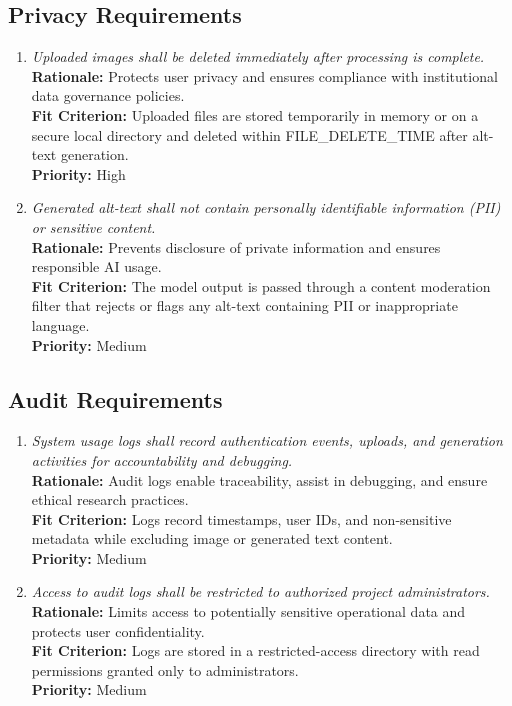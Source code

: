 \documentclass[12pt]{article}
\begin{document}
\subsection{Privacy Requirements}
\begin{enumerate}[label=SR-PR \arabic*., wide=0pt, leftmargin=*]
\item \emph{Uploaded images shall be deleted immediately after processing is complete.}\\[2mm] 
    {\bf Rationale:} Protects user privacy and ensures compliance with institutional data governance policies.\\
    {\bf Fit Criterion:} Uploaded files are stored temporarily in memory or on a secure local directory and deleted within FILE\_DELETE\_TIME after alt-text generation.\\
    {\bf Priority:} High

\item \emph{Generated alt-text shall not contain personally identifiable information (PII) or sensitive content.}\\[2mm] 
    {\bf Rationale:} Prevents disclosure of private information and ensures responsible AI usage.\\
    {\bf Fit Criterion:} The model output is passed through a content moderation filter that rejects or flags any alt-text containing PII or inappropriate language.\\
    {\bf Priority:} Medium
\end{enumerate}

\subsection{Audit Requirements}
\begin{enumerate}[label=SR-AU \arabic*., wide=0pt, leftmargin=*]
\item \emph{System usage logs shall record authentication events, uploads, and generation activities for accountability and debugging.}\\[2mm] 
    {\bf Rationale:} Audit logs enable traceability, assist in debugging, and ensure ethical research practices.\\
    {\bf Fit Criterion:} Logs record timestamps, user IDs, and non-sensitive metadata while excluding image or generated text content.\\
    {\bf Priority:} Medium

\item \emph{Access to audit logs shall be restricted to authorized project administrators.}\\[2mm] 
    {\bf Rationale:} Limits access to potentially sensitive operational data and protects user confidentiality.\\
    {\bf Fit Criterion:} Logs are stored in a restricted-access directory with read permissions granted only to administrators.\\
    {\bf Priority:} Medium
\end{enumerate}
\end{document}
